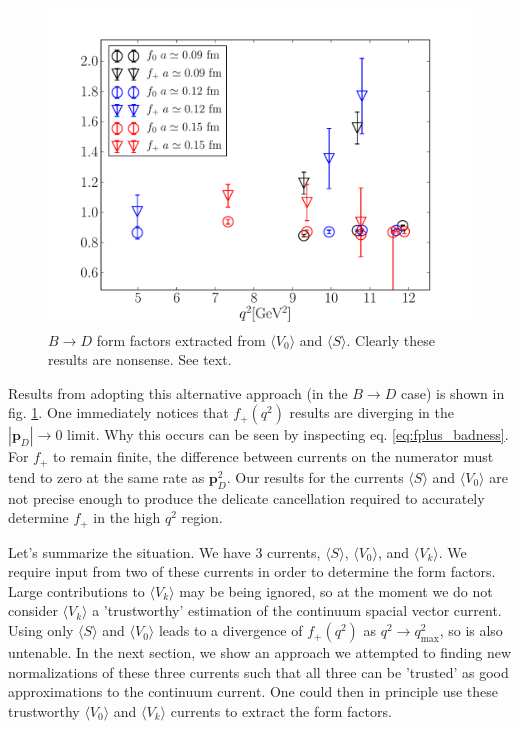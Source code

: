 \begin{figure}[htb!]
  \begin{center}
    \includegraphics[width=1.0\textwidth]{images/nrqcd/BD_formfactors_fromV0S.pdf}
  \end{center}
  \caption{$B\to D$ form factors extracted from $\langle V_0 \rangle$ and $\langle S \rangle$. Clearly these results are nonsense. See text. \label{fig:f0fp_fromV0S}}
\end{figure}

Results from adopting this alternative approach (in the $B\to D$ case) is shown in fig. \ref{fig:f0fp_fromV0S}. One immediately notices that $f_+(q^2)$ results are diverging in the $|{\textbf{p}}_{D}| \to 0$ limit. Why this occurs can be seen by inspecting eq. \eqref{eq:fplus_badness}. For $f_+$ to remain finite, the difference between currents on the numerator must tend to zero at the same rate as ${\textbf{p}}_D^2$. Our results for the currents $\langle S \rangle$ and $\langle V_0 \rangle$ are not precise enough to produce the delicate cancellation required to accurately determine $f_+$ in the high $q^2$ region.

Let's summarize the situation. We have 3 currents, $\langle S \rangle$, $\langle V_0 \rangle$, and $\langle V_k \rangle$. We require input from two of these currents in order to determine the form factors. Large contributions to $\langle V_k \rangle$ may be being ignored, so at the moment we do not consider $\langle V_k \rangle$ a 'trustworthy' estimation of the continuum spacial vector current. Using only $\langle S \rangle$ and $\langle V_0 \rangle$ leads to a divergence of $f_+(q^2)$ as $q^2\to q^2_{\text{max}}$, so is also untenable. In the next section, we show an approach we attempted to finding new normalizations of these three currents such that all three can be 'trusted' as good approximations to the continuum current. One could then in principle use these trustworthy $\langle V_0 \rangle$ and $\langle V_k \rangle$ currents to extract the form factors.

